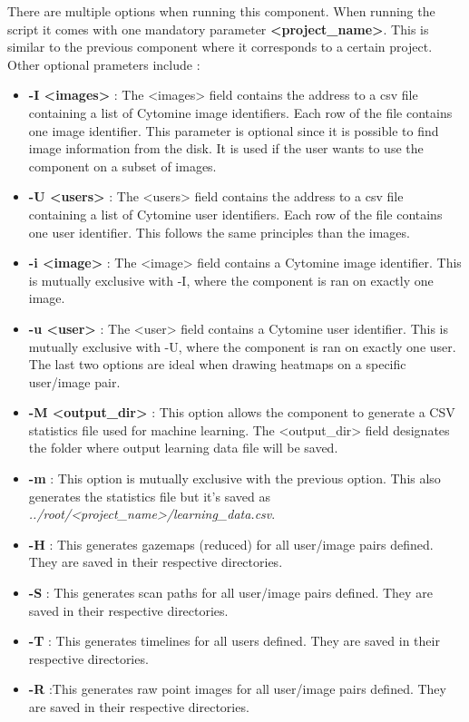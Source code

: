 \documentclass[a4paper,11pt]{report}
\numberwithin{figure}{section} %
\begin{document}
    There are multiple options when running this component.
    When running the script it comes with one mandatory parameter \textbf{<project\_name>}.
    This is similar to the previous component where it corresponds to a certain project.
    Other optional prameters include :
    \begin{itemize}
        \item[\textbullet] \textbf{-I <images>} : The <images> field contains the address to a csv file containing a list of Cytomine image identifiers.
        Each row of the file contains one image identifier.
        This parameter is optional since it is possible to find image information from the disk.
        It is used if the user wants to use the component on a subset of images.
        \item[\textbullet] \textbf{-U <users>} : The <users> field contains the address to a csv file containing a list of Cytomine user identifiers.
        Each row of the file contains one user identifier.
        This follows the same principles than the images.
        \item[\textbullet] \textbf{-i <image>} : The <image> field contains a Cytomine image identifier.
        This is mutually exclusive with -I, where the component is ran on exactly one image.
        \item[\textbullet] \textbf{-u <user>} : The <user> field contains a Cytomine user identifier.
        This is mutually exclusive with -U, where the component is ran on exactly one user.
        The last two options are ideal when drawing heatmaps on a specific user/image pair.
        \item[\textbullet] \textbf{-M <output\_dir>} : This option allows the component to generate a CSV statistics file used for machine learning.
        The <output\_dir> field designates the folder where output learning data file will be saved.
        \item[\textbullet] \textbf{-m} : This option is mutually exclusive with the previous option.
        This also generates the statistics file but it's saved as \textit{../root/<project\_name>/learning\_data.csv}.
        \item[\textbullet] \textbf{-H} : This generates gazemaps (reduced) for all user/image pairs defined.
        They are saved in their respective directories.
        \item[\textbullet] \textbf{-S} : This generates scan paths for all user/image pairs defined.
        They are saved in their respective directories.
        \item[\textbullet] \textbf{-T} : This generates timelines for all users defined.
        They are saved in their respective directories.
        \item[\textbullet] \textbf{-R} :This generates raw point images for all user/image pairs defined.
        They are saved in their respective directories.
    \end{itemize}
\end{document}
